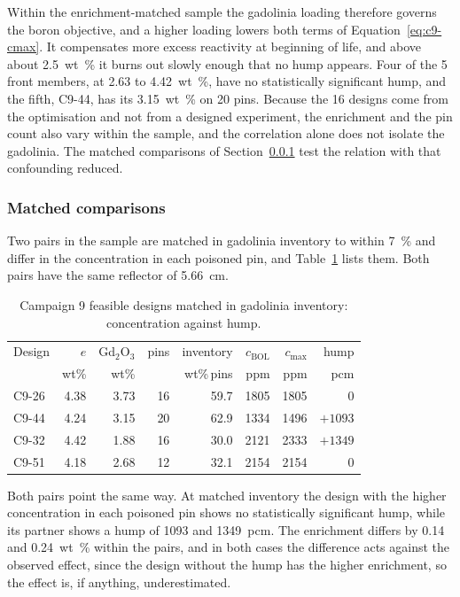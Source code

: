 Within the enrichment-matched sample the gadolinia loading therefore
governs the boron objective, and a higher loading lowers both terms of
Equation~\eqref{eq:c9-cmax}. It compensates more excess reactivity at
beginning of life, and above about \SI{2.5}{wt\%} it burns out slowly
enough that no hump appears. Four of the 5 front members, at 2.63 to
\SI{4.42}{wt\%}, have no statistically significant hump, and the fifth,
C9-44, has its \SI{3.15}{wt\%} on 20 pins. Because the 16 designs come
from the optimisation and not from a designed experiment, the
enrichment and the pin count also vary within the sample, and the
correlation alone does not isolate the gadolinia. The matched
comparisons of Section~\ref{sec:res-c9-gd-matched} test the relation
with that confounding reduced.

\subsubsection{Matched comparisons}
\label{sec:res-c9-gd-matched}
Two pairs in the sample are matched in gadolinia inventory to within
\SI{7}{\%} and differ in the concentration in each poisoned pin, and
Table~\ref{tab:c9-pairs} lists them. Both pairs have the same reflector
of \SI{5.66}{cm}.

\begin{table}[htbp]
  \centering
  \caption{Campaign 9 feasible designs matched in gadolinia inventory: concentration against hump.}
  \label{tab:c9-pairs}
  \small
  \begin{tabular}{@{}lrrrrrrr@{}}
    \toprule
    Design & $e$ & Gd$_2$O$_3$ & pins & inventory & $c_\mathrm{BOL}$ &
    $c_\mathrm{max}$ & hump \\
     & wt\% & wt\% & & wt\%\,pins & ppm & ppm & pcm \\
    \midrule
    C9-26 & 4.38 & 3.73 & 16 & 59.7 & 1805 & 1805 & 0 \\
    C9-44 & 4.24 & 3.15 & 20 & 62.9 & 1334 & 1496 & $+1093$ \\
    \addlinespace
    C9-32 & 4.42 & 1.88 & 16 & 30.0 & 2121 & 2333 & $+1349$ \\
    C9-51 & 4.18 & 2.68 & 12 & 32.1 & 2154 & 2154 & 0 \\
    \bottomrule
  \end{tabular}
\end{table}

Both pairs point the same way. At matched inventory the design with the
higher concentration in each poisoned pin shows no statistically significant hump, while its
partner shows a hump of 1093 and \SI{1349}{pcm}. The enrichment differs by
0.14 and \SI{0.24}{wt\%} within the pairs, and in both cases the difference
acts against the observed effect, since the design without the hump has
the higher enrichment, so the effect is, if anything, underestimated.

